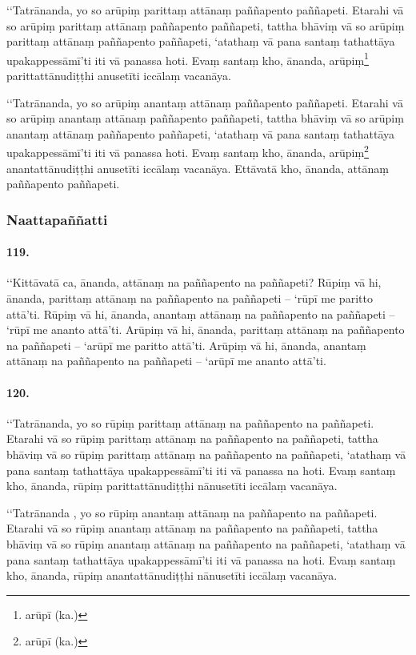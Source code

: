 ‘‘Tatrānanda, yo so arūpiṃ parittaṃ attānaṃ paññapento paññapeti. Etarahi vā so arūpiṃ parittaṃ attānaṃ paññapento paññapeti, tattha bhāviṃ vā so arūpiṃ parittaṃ attānaṃ paññapento paññapeti, ‘atathaṃ vā pana santaṃ tathattāya upakappessāmī’ti iti vā panassa hoti. Evaṃ santaṃ kho, ānanda, arūpiṃ\footnote{arūpī (ka.)} parittattānudiṭṭhi anusetīti iccālaṃ vacanāya.

‘‘Tatrānanda, yo so arūpiṃ anantaṃ attānaṃ paññapento paññapeti. Etarahi vā so arūpiṃ anantaṃ attānaṃ paññapento paññapeti, tattha bhāviṃ vā so arūpiṃ anantaṃ attānaṃ paññapento paññapeti, ‘atathaṃ vā pana santaṃ tathattāya upakappessāmī’ti iti vā panassa hoti. Evaṃ santaṃ kho, ānanda, arūpiṃ\footnote{arūpī (ka.)} anantattānudiṭṭhi anusetīti iccālaṃ vacanāya. Ettāvatā kho, ānanda, attānaṃ paññapento paññapeti.

\subsubsection{Naattapaññatti}

\paragraph{119.} ‘‘Kittāvatā ca, ānanda, attānaṃ na paññapento na paññapeti? Rūpiṃ vā hi, ānanda, parittaṃ attānaṃ na paññapento na paññapeti – ‘rūpī me paritto attā’ti. Rūpiṃ vā hi, ānanda, anantaṃ attānaṃ na paññapento na paññapeti – ‘rūpī me ananto attā’ti. Arūpiṃ vā hi, ānanda, parittaṃ attānaṃ na paññapento na paññapeti – ‘arūpī me paritto attā’ti. Arūpiṃ vā hi, ānanda, anantaṃ attānaṃ na paññapento na paññapeti – ‘arūpī me ananto attā’ti.

\paragraph{120.} ‘‘Tatrānanda, yo so rūpiṃ parittaṃ attānaṃ na paññapento na paññapeti. Etarahi vā so rūpiṃ parittaṃ attānaṃ na paññapento na paññapeti, tattha bhāviṃ vā so rūpiṃ parittaṃ attānaṃ na paññapento na paññapeti, ‘atathaṃ vā pana santaṃ tathattāya upakappessāmī’ti iti vā panassa na hoti. Evaṃ santaṃ kho, ānanda, rūpiṃ parittattānudiṭṭhi nānusetīti iccālaṃ vacanāya.

‘‘Tatrānanda , yo so rūpiṃ anantaṃ attānaṃ na paññapento na paññapeti. Etarahi vā so rūpiṃ anantaṃ attānaṃ na paññapento na paññapeti, tattha bhāviṃ vā so rūpiṃ anantaṃ attānaṃ na paññapento na paññapeti, ‘atathaṃ vā pana santaṃ tathattāya upakappessāmī’ti iti vā panassa na hoti. Evaṃ santaṃ kho, ānanda, rūpiṃ anantattānudiṭṭhi nānusetīti iccālaṃ vacanāya.

